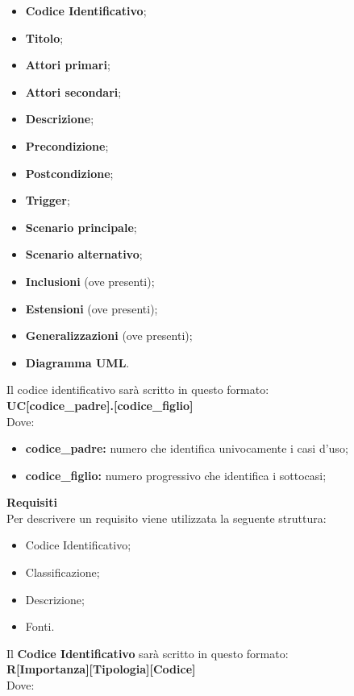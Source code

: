 \begin{itemize}
	\item \textbf{Codice Identificativo};
	\item \textbf{Titolo};
	\item \textbf{Attori primari};
	\item \textbf{Attori secondari};
	\item \textbf{Descrizione};
	\item \textbf{Precondizione};
	\item \textbf{Postcondizione};
	\item \textbf{Trigger};
	\item \textbf{Scenario principale};
	\item \textbf{Scenario alternativo};
	\item \textbf{Inclusioni} (ove presenti);
	\item \textbf{Estensioni} (ove presenti);
	\item \textbf{Generalizzazioni} (ove presenti);
	\item \textbf{Diagramma UML}.	
\end{itemize}
Il codice identificativo sarà scritto in questo formato: \\
\textbf{UC[codice\_padre].[codice\_figlio]} \\
Dove:
\begin{itemize}
	\item \textbf{codice\_padre:} numero che identifica univocamente i casi d'uso;
	\item \textbf{codice\_figlio:} numero progressivo che identifica i sottocasi;
\end{itemize}
\textbf{Requisiti}\\%
Per descrivere un requisito viene utilizzata la seguente struttura:
\begin{itemize}
	\item Codice Identificativo;
	\item Classificazione;
	\item Descrizione;
	\item Fonti.
\end{itemize} 
Il \textbf{Codice Identificativo} sarà scritto in questo formato: \\
\textbf{R[Importanza][Tipologia][Codice]} \\
Dove:
